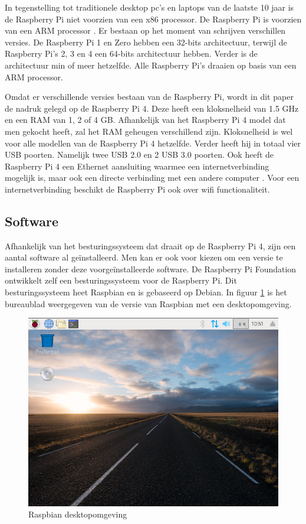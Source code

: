 \documentclass[a4paper, dutch, abstract=true]{scrartcl}
\begin{document}
In tegenstelling tot traditionele desktop pc's en laptops van de laatste 10 jaar is de Raspberry Pi
niet voorzien van een x86 processor.
De Raspberry Pi is voorzien van een ARM processor \cite{jain2014raspberry}.
Er bestaan op het moment van schrijven verschillen versies.
De Raspberry Pi 1 en Zero hebben een 32-bits architectuur, terwijl de Raspberry Pi's 2, 3 en 4 een
64-bits architectuur hebben.
Verder is de architectuur min of meer hetzelfde.
Alle Raspberry Pi's draaien op basis van een ARM processor.

Omdat er verschillende versies bestaan van de Raspberry Pi, wordt in dit paper de nadruk gelegd op
de Raspberry Pi 4.
Deze heeft een kloksnelheid van 1.5 GHz en een RAM van 1, 2 of 4 GB.
Afhankelijk van het Raspberry Pi 4 model dat men gekocht heeft, zal het RAM geheugen verschillend
zijn.
Kloksnelheid is wel voor alle modellen van de Raspberry Pi 4 hetzelfde.
Verder heeft hij in totaal vier USB poorten.
Namelijk twee USB 2.0 en 2 USB 3.0 poorten.
Ook heeft de Raspberry Pi 4 een Ethernet aansluiting waarmee een internetverbinding mogelijk is,
maar ook een directe verbinding met een andere computer \cite{maksimovic2014raspberry}.
Voor een internetverbinding beschikt de Raspberry Pi ook over wifi functionaliteit.

\subsection{Software}
Afhankelijk van het besturingssysteem dat draait op de Raspberry Pi 4, zijn een aantal software al
ge{\"i}nstalleerd.
Men kan er ook voor kiezen om een versie te installeren zonder deze voorge{\"i}nstalleerde software.
De Raspberry Pi Foundation ontwikkelt zelf een besturingssysteem voor de Raspberry Pi.
Dit besturingssysteem heet Raspbian en is gebaseerd op Debian.
In figuur \ref{fig:raspbian} is het bureaublad weergegeven van de versie van Raspbian met een
desktopomgeving.
\begin{figure}[h]
    \centering
    \includegraphics[scale=0.5]{raspbian.png}
    \caption{Raspbian desktopomgeving}
    \label{fig:raspbian}
\end{figure}
\end{document}
